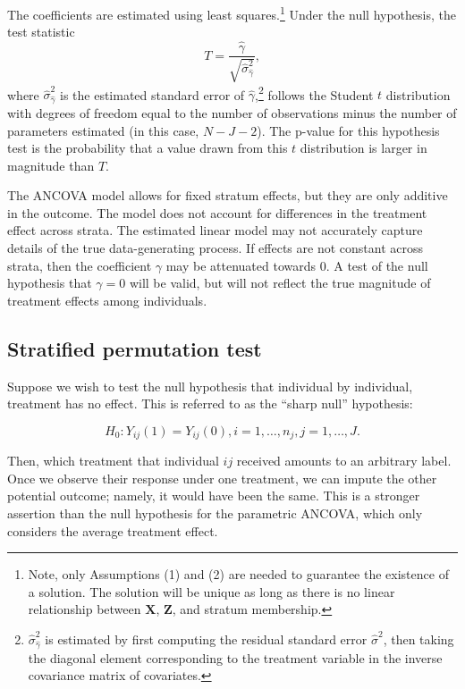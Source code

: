 \documentclass[11pt]{article}
\newcommand{\todo}[1]{{\color{red}{TO DO: \sc #1}}}
\begin{document}
The coefficients are estimated using least squares.\footnote{
Note, only Assumptions (1) and (2) are needed to guarantee the existence of a solution.
The solution will be unique as long as there is no linear relationship between $\mathbf{X}$, $\mathbf{Z}$, and stratum membership.
}
Under the null hypothesis, the test statistic 
$$ T = \frac{\hat{\gamma}}{\sqrt{ \hat{\sigma}_{\hat{\gamma}}^2}},$$
where $\hat{\sigma}_{\hat{\gamma}}^2$ is the estimated standard error of $\hat{\gamma}$,\footnote{
$\hat{\sigma}_{\hat{\gamma}}^2$ is estimated by first computing the residual standard error $\hat{\sigma}^2$,
then taking the diagonal element corresponding to the treatment variable in the inverse covariance matrix of covariates.
}
follows the Student $t$ distribution with degrees of freedom equal to the number of observations minus the number of parameters estimated (in this case, $N - J - 2$).
The p-value for this hypothesis test is the probability that a value drawn from this $t$ distribution is larger in magnitude than $T$.

\todo{Add a paragraph about why this might go wrong, perhaps some citations. All depends on estimating the error variance correctly, because $t$ distribution is the ratio of a normal and a chi-square}


The ANCOVA model allows for fixed stratum effects, but they are only additive in the outcome.  
The model does not account for differences in the treatment effect across strata.  
The estimated linear model may not accurately capture details of the true data-generating process.  
If effects are not constant across strata, then the coefficient $\gamma$ may be attenuated towards 0.  
A test of the null hypothesis that $\gamma = 0$ will be valid, but will not reflect the true magnitude of treatment effects among individuals.

\subsection{Stratified permutation test}
Suppose we wish to test the null hypothesis that individual by individual, treatment has no effect.
This is referred to as the ``sharp null'' hypothesis:

$$H_0: Y_{ij}(1) = Y_{ij}(0), i = 1, \dots, n_j, j = 1,\dots, J.$$

Then, which treatment that individual $ij$ received amounts to an arbitrary label.
Once we observe their response under one treatment, we can impute the other potential outcome; namely, it would have been the same.
This is a stronger assertion than the null hypothesis for the parametric ANCOVA, which only considers the average treatment effect.
\end{document}
